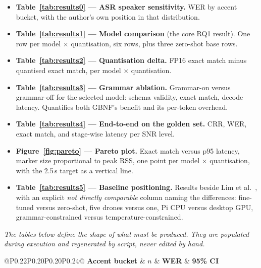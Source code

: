 \documentclass[11pt,a4paper]{article}
\newcommand{\munit}[1]{\,#1}
\begin{document}
\begin{itemize}[leftmargin=1.4em,itemsep=2pt]
  \item \textbf{Table~\ref{tab:results0} --- ASR speaker sensitivity.} WER by accent bucket, with the
        author's own position in that distribution.
  \item \textbf{Table~\ref{tab:results1} --- Model comparison} (the core RQ1 result). One row per model
        $\times$ quantisation, six rows, plus three zero-shot base rows.
  \item \textbf{Table~\ref{tab:results2} --- Quantisation delta.} FP16 exact match minus quantised exact
        match, per model $\times$ quantisation.
  \item \textbf{Table~\ref{tab:results3} --- Grammar ablation.} Grammar-on versus grammar-off for the
        selected model: schema validity, exact match, decode latency. Quantifies both GBNF's benefit and
        its per-token overhead.
  \item \textbf{Table~\ref{tab:results4} --- End-to-end on the golden set.} CRR, WER, exact match, and
        stage-wise latency per SNR level.
  \item \textbf{Figure~\ref{fig:pareto} --- Pareto plot.} Exact match versus p95 latency, marker size
        proportional to peak RSS, one point per model $\times$ quantisation, with the 2.5\munit{s} target
        as a vertical line.
  \item \textbf{Table~\ref{tab:results5} --- Baseline positioning.} Results beside Lim et al.\
        \cite{lim2025}, with an explicit \emph{not directly comparable} column naming the differences:
        fine-tuned versus zero-shot, five drones versus one, Pi CPU versus desktop GPU,
        grammar-constrained versus temperature-constrained.
\end{itemize}

\noindent\emph{The tables below define the shape of what must be produced. They are populated during
execution and regenerated by script, never edited by hand.}

\begin{table}[htbp]\centering\caption{ASR speaker sensitivity (Exp-0) --- populated D6}\label{tab:results0}
\small\begin{tabular}{@{}P{0.22}P{0.20}P{0.20}P{0.24}@{}}
\toprule
\textbf{Accent bucket} & \textbf{$n$} & \textbf{WER} & \textbf{95\% CI} \\
\midrule
{} \\
\bottomrule
\end{tabular}\end{table}
\end{document}
